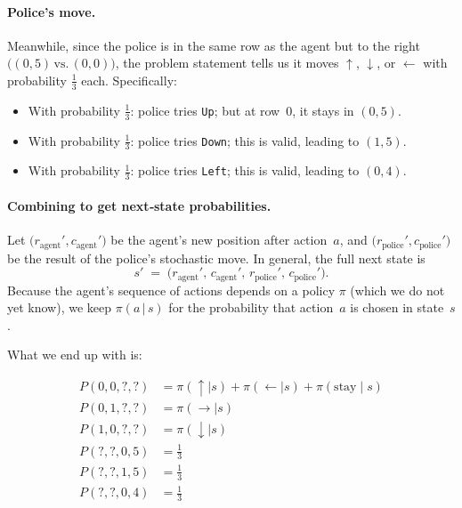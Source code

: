 \begin{enumerate}
    \paragraph{Police's move.}
    Meanwhile, since the police is in the same row as the agent but to the right 
    \(\bigl((0,5)\,\text{vs.}\,(0,0)\bigr)\), 
    the problem statement tells us it moves 
    \(\uparrow\), \(\downarrow\), or \(\leftarrow\) with probability \(\tfrac{1}{3}\) each. 
    Specifically:
    \begin{itemize}
      \item With probability \(\tfrac{1}{3}\): police tries \texttt{Up}; 
            but at row~0, it stays in \((0,5)\).
      \item With probability \(\tfrac{1}{3}\): police tries \texttt{Down}; 
            this is valid, leading to \((1,5)\).
      \item With probability \(\tfrac{1}{3}\): police tries \texttt{Left}; 
            this is valid, leading to \((0,4)\).
    \end{itemize}

    \paragraph{Combining to get next‐state probabilities.}
    Let \(\bigl(r_{\text{agent}}',c_{\text{agent}}'\bigr)\) be the agent’s new position 
    after action~\(a\), 
    and \(\bigl(r_{\text{police}}',c_{\text{police}}'\bigr)\) be the result of the police’s stochastic move.  
    In general, the full next state is 
    \[
      s' \;=\; \bigl(r_{\text{agent}}',\,c_{\text{agent}}',\,r_{\text{police}}',\,c_{\text{police}}'\bigr).
    \]
    Because the agent’s sequence of actions depends on a policy \(\pi\) (which we do not yet know), 
    we keep \(\pi(a\,\lvert\,s)\) for the probability that action~\(a\) is chosen in state~\(s\). 
    
    What we end up with is:

    \begin{align*}
      P(0, 0, ?, ?) &= \pi(\uparrow \mid s) + \pi(\leftarrow \mid s) + \pi(\text{stay} \mid s) \\
      P(0, 1, ?, ?) &= \pi(\rightarrow \mid s) \\
      P(1, 0, ?, ?) &= \pi(\downarrow \mid s) \\
      P(?, ?, 0, 5) &= \tfrac{1}{3} \\
      P(?, ?, 1, 5) &= \tfrac{1}{3} \\
      P(?, ?, 0, 4) &= \tfrac{1}{3}
    \end{align*}

\end{enumerate}


